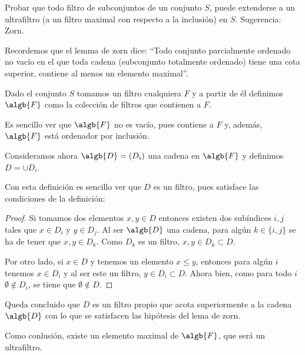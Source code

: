 \begin{problem}
Probar que todo filtro de subconjuntos de un conjunto $S$,
 puede extenderse a un ultrafiltro (a un filtro maximal con respecto a la inclusión) en $S$.
Sugerencia: Zorn.

\solution

Recordemos que el lemma de zorn dice: ``Todo conjunto parcialmente ordenado no vacío en el que toda cadena (subconjunto totalmente ordenado) tiene una cota superior, contiene al menos un elemento maximal''.

Dado el conjunto $S$ tomamos un filtro cualquiera $F$ y a partir de él definimos $\algb{F}$ como la colección de filtros que contienen a $F$.

Es sencillo ver que $\algb{F}$ no es vacío, pues contiene a $F$ y, además, $\algb{F}$ está ordenador por inclusión.

Consideramos ahora $\algb{D}=(D_i)$ una cadena en $\algb{F}$ y definimos $D=\cup D_i$.

Con esta definición es sencillo ver que $D$ es un filtro, pues satisface las condiciones de la definición:
\begin{proof}
Si tomamos dos elementos $x,y \in D$ entonces existen dos subíndices $i,j$ tales que $x\in D_i$ y $y \in D_j$. Al ser $\algb{D}$ una cadena, para algún $k\in \{i,j\}$ se ha de tener que $x,y \in D_k$. Como $D_k$ es un filtro, $x,y \in D_k \subset D$.

Por otro lado, si $x\in D$ y tenemos un elemento $x \leq y$, entonces para algún $i$ tenemos $x\in D_i$ y al ser este un filtro, $y \in D_i \subset D$. Ahora bien, como para todo $i$ $\emptyset \notin D_i$, se tiene que $\emptyset \notin D$.

\end{proof}

Queda concluido que $D$ es un filtro propio que acota superiormente a la cadena $\algb{D}$ con lo que se satisfacen las hipótesis del lema de zorn.

Como conlusión, existe un elemento maximal de $\algb{F}$, que será un ultrafiltro.
\end{problem}

